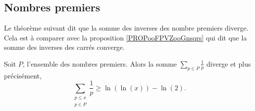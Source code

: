 \subsection{Nombres premiers}

Le théorème suivant dit que la somme des inverses des nombre premiers diverge. Cela est à comparer avec la proposition \ref{PROPooFPVZooGnsqrs} qui dit que la somme des inverses des carrés converge.
\begin{theorem} \label{ThonfVruT}
	Soit \( P\), l'ensemble des nombres premiers. Alors la somme \( \sum_{p\in P}\frac{1}{ p }\) diverge et plus précisément,
	\begin{equation}
		\sum_{\substack{p\leq x\\p\in P}}\frac{1}{ p }\geq \ln(\ln(x))-\ln(2).
	\end{equation}
\end{theorem}

